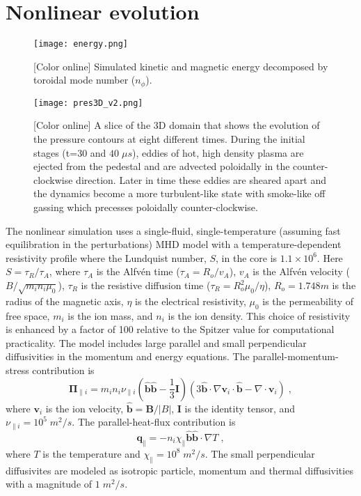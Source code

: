 \section{Nonlinear evolution}
\label{sec:nonlinear}

\begin{figure}
  \texttt{[image: energy.png]}
  \vspace{-6mm}
  \caption{[Color online]
  Simulated kinetic and magnetic energy decomposed by toroidal mode number ($n_\phi$).}
  \label{fig:energy}
\end{figure}

\begin{figure*}
  \centering
  \texttt{[image: pres3D\_v2.png]}
  \vspace{-4mm}
  \caption{[Color online]
  A slice of the 3D domain that shows the evolution of the pressure contours at
eight different times. During the initial stages (t=$30$ and $40\;\mu s$), eddies
of hot, high density plasma are ejected from the pedestal and are advected
poloidally in the counter-clockwise direction. Later in time these eddies are
sheared apart and the dynamics become a more turbulent-like state with smoke-like
off gassing which precesses poloidally counter-clockwise. }
  \label{fig:pres3D}
\end{figure*}

The nonlinear simulation uses a single-fluid, single-temperature (assuming fast
equilibration in the perturbations) MHD model with a temperature-dependent
resistivity profile where the Lundquist number, $S$, in the core is
$1.1\times10^6$. Here $S=\tau_R/\tau_A$, where $\tau_A$ is the Alfvén time
($\tau_A=R_o/v_A$), $v_A$ is the Alfvén velocity ($B/\sqrt{m_i n_i \mu_0}$),
$\tau_R$ is the resistive diffusion time ($\tau_R=R_o^2 \mu_0/\eta$),
$R_o=1.748 m$ is the radius of the magnetic axis, $\eta$ is the electrical
resistivity, $\mu_0$ is the permeability of free space, $m_i$ is the ion mass,
and $n_i$ is the ion density.  This choice of resistivity is enhanced by a
factor of 100 relative to the Spitzer value for computational practicality.
The model includes large parallel and small perpendicular diffusivities in 
the momentum and energy equations. The parallel-momentum-stress contribution is 
\begin{equation}
\mathbf{\Pi}_{\parallel i}=
  m_i n_i \nu_{\parallel i}
  \left(\hat{\mathbf{b}}
  \hat{\mathbf{b}}-\frac{1}{3}\mathbf{I}\right)\left(
  3\hat{\mathbf{b}}\cdot\nabla\mathbf{v}_{i}\cdot
  \hat{\mathbf{b}}-\nabla\cdot\mathbf{v}_{i}\right)\;,
\end{equation} where $\mathbf{v}_i$ is the ion velocity,
$\hat{\mathbf{b}}=\mathbf{B}/|B|$, $\mathbf{I}$ is the identity tensor, and
$\nu_{\parallel i}=10^5\;m^2/s$. The parallel-heat-flux contribution is
\begin{equation}
\mathbf{q}_{\parallel}=
  -n_i \chi_{\parallel}
  \hat{\mathbf{b}}\hat{\mathbf{b}}\cdot\nabla T\;,
\end{equation}
where $T$ is the temperature and $\chi_{\parallel}=10^8\;m^2/s$.
The small perpendicular diffusivites are modeled as isotropic particle,
momentum and thermal diffusivities with a magnitude of $1\;m^2/s$.

